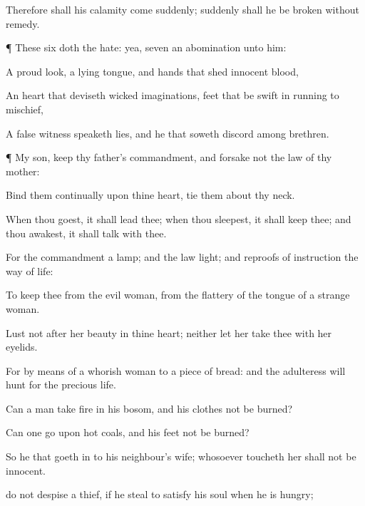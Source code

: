 {Therefore shall his
calamity
come
suddenly;
suddenly shall he be
broken without
remedy.


\par }{\PP {}¶ These
six
{} doth the
{}
hate: yea,
seven
{} an
abomination unto
him:

A
proud
look, a
lying
tongue, and
hands that
shed
innocent
blood,

An
heart that
deviseth
wicked
imaginations,
feet that be
swift in
running to
mischief,

A
false
witness
{}
speaketh
lies, and he that
soweth
discord among
brethren.


\par }{\PP {}¶ My
son,
keep thy
father’s
commandment, and
forsake not the
law of thy
mother:

Bind them
continually upon thine
heart,
{}
tie them about thy
neck.

When thou
goest, it shall
lead thee; when thou
sleepest, it shall
keep thee; and
{} thou
awakest, it shall
talk with thee.

For the
commandment
{} a
lamp; and the
law
{}
light; and
reproofs of
instruction
{} the
way of
life:

To
keep thee from the
evil
woman, from the
flattery of the
tongue of a strange
woman.

Lust not after her
beauty in thine
heart; neither let her
take thee with her
eyelids.

For by means
of a
whorish
woman
{} to a
piece of
bread: and the
adulteress will
hunt for the
precious
life.

Can a
man
take
fire in his
bosom, and his
clothes not be
burned?

Can
one
go upon hot
coals, and his
feet not be
burned?

So he that goeth
in to his
neighbour’s
wife; whosoever
toucheth her shall not be
innocent.

 do not
despise a
thief, if he
steal to
satisfy his
soul when he is
hungry;

}
